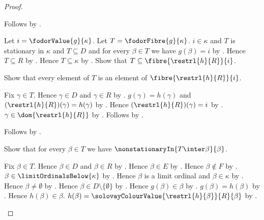 \begin{proof}
\begin{subproof}
        Follows by .
    \end{subproof}
    Let $i=$.
    Let $T=$.
    $i\in\kappa$ and $T$ is stationary in $\kappa$ and
        $T\subseteq D$ and
        for every $\beta\in T$ we have $g(\beta)=i$
        by .
    Hence $T\subseteq R$ by .
    Hence $T\subseteq\kappa$ by .
    Show that $T\subseteq{}$.
    \begin{subproof}
        Show that every element of $T$ is an element of
            $$.
        \begin{subproof}
            Fix $\gamma\in T$.
            Hence $\gamma\in D$ and $\gamma\in R$ by .
            $g(\gamma)=h(\gamma)$ and
                $()(\gamma)=h(\gamma)$
                by .
            Hence $()(\gamma)=i$ by \auto.
            $\gamma\in{}$
                by .
            Follows by .
        \end{subproof}
        Follows by .
    \end{subproof}
    Show that for every $\beta\in T$ we have
        $$.
    \begin{subproof}
        Fix $\beta\in T$.
        Hence $\beta\in D$ and $\beta\in R$ by .
        Hence $\beta\in E$ by .
        Hence $\beta\notin F$ by .
        $\beta\in\limitOrdinalsBelow{\kappa}$ by .
        Hence $\beta$ is a limit ordinal and $\beta\in\kappa$
            by .
        Hence $\beta\neq\emptyset$ by .
        Hence $\beta\in D\setminus\{\emptyset\}$
            by .
        Hence $g(\beta)\in\beta$ by .
        $g(\beta)=h(\beta)$ by .
        Hence $h(\beta)\in\beta$.
        $h(\beta)=$
            by .

\end{subproof}
\end{proof}
